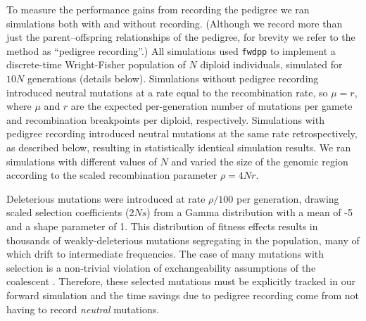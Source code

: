 \documentclass{article}
\newcommand{\fwdpp}{\texttt{fwdpp}}
\begin{document}
To measure the performance gains from recording the pedigree we ran simulations
both with and without recording.
(Although we record more than just the parent--offspring relationships of the pedigree,
for brevity we refer to the method as ``pedigree recording''.)
All simulations used \fwdpp{} to implement a discrete-time Wright-Fisher population of $N$ diploid individuals,
simulated for $10N$ generations (details below).
Simulations without pedigree recording introduced neutral mutations at a rate
equal to the recombination rate,
so $\mu = r$, where $\mu$ and $r$ are the expected per-generation number of mutations per gamete
and recombination breakpoints per diploid, respectively.
Simulations with pedigree recording introduced neutral mutations at the same rate
retrospectively, as described below, resulting in statistically identical simulation results.
We ran simulations with different values of $N$ and varied the size of the genomic region according to the scaled recombination
parameter $\rho = 4Nr$.

Deleterious mutations were introduced at rate $\rho/100$ per generation, drawing scaled selection
coefficients ($2Ns$)
from a Gamma distribution with a mean of -5 and a shape parameter of 1.  This distribution of fitness effects results in
thousands of weakly-deleterious mutations segregating in the population, many of which drift to intermediate
frequencies.  The case of many mutations with selection is a non-trivial violation of exchangeability assumptions of the
coalescent \citep{Neuhauser1997-nn}.  Therefore, these selected mutations must be explicitly tracked in our forward simulation
and the time savings due to pedigree recording come from not having to record \textit{neutral} mutations.
\end{document}
